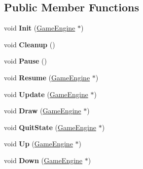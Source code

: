 \subsection*{Public Member Functions}
\begin{DoxyCompactItemize}
\item 
\hypertarget{class_save_state_a0030965580764b7425dc7add06af1caf}{}void {\bfseries Init} (\hyperlink{class_game_engine}{Game\+Engine} $\ast$)\label{class_save_state_a0030965580764b7425dc7add06af1caf}

\item 
\hypertarget{class_save_state_a0f76900fc0c058d3951ccf1009006cd0}{}void {\bfseries Cleanup} ()\label{class_save_state_a0f76900fc0c058d3951ccf1009006cd0}

\item 
\hypertarget{class_save_state_a4cbb025d501140622084fbdf4b4a632e}{}void {\bfseries Pause} ()\label{class_save_state_a4cbb025d501140622084fbdf4b4a632e}

\item 
\hypertarget{class_save_state_a52f99fdd495e1b7e8076369331c8accb}{}void {\bfseries Resume} (\hyperlink{class_game_engine}{Game\+Engine} $\ast$)\label{class_save_state_a52f99fdd495e1b7e8076369331c8accb}

\item 
\hypertarget{class_save_state_a21b9a1ae0201c5dab0acba97e79d629c}{}void {\bfseries Update} (\hyperlink{class_game_engine}{Game\+Engine} $\ast$)\label{class_save_state_a21b9a1ae0201c5dab0acba97e79d629c}

\item 
\hypertarget{class_save_state_a0f550a2199d4ec3551272a5882e965c2}{}void {\bfseries Draw} (\hyperlink{class_game_engine}{Game\+Engine} $\ast$)\label{class_save_state_a0f550a2199d4ec3551272a5882e965c2}

\item 
\hypertarget{class_save_state_a983f84f47c5499f6a2a6b60d3821277a}{}void {\bfseries Quit\+State} (\hyperlink{class_game_engine}{Game\+Engine} $\ast$)\label{class_save_state_a983f84f47c5499f6a2a6b60d3821277a}

\item 
\hypertarget{class_save_state_a6d7812bb899af279722e8053d00c9ae2}{}void {\bfseries Up} (\hyperlink{class_game_engine}{Game\+Engine} $\ast$)\label{class_save_state_a6d7812bb899af279722e8053d00c9ae2}

\item 
\hypertarget{class_save_state_a00ce4d2ac798224516526a5b5b18c7a8}{}void {\bfseries Down} (\hyperlink{class_game_engine}{Game\+Engine} $\ast$)\label{class_save_state_a00ce4d2ac798224516526a5b5b18c7a8}


\end{DoxyCompactItemize}
